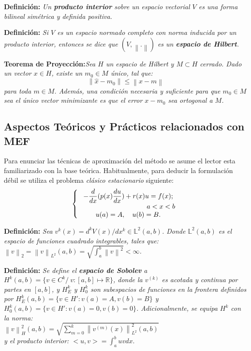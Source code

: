 \documentclass[12pt]{article}
\begin{document}
{\bf Definición: } {\em Un \textbf{producto interior} sobre un espacio vectorial $V$ es una forma bilineal simétrica y definida positiva.}

{\bf Definición: }{\em Si $V$ es un espacio normado completo con norma inducida por un producto interior, entonces se dice que $(V,\left\|.\right\|)$ es un \textbf{espacio de Hilbert}.}

{\bf Teorema de Proyección:}{\em Sea $H$ un espacio de Hilbert y $M\subset H$ cerrado. Dado un vector $\textit{x} \in H$, existe un $m_0 \in M$ único, tal que:
\[\left\| \hat{x}- m_0\right \| \leq \left\| x-m\right\|\]
para toda $m \in M$. Además, una condición necesaria y suficiente para que $m_0 \in M$ sea el único vector minimizante es que el error $\textit{x}-m_0$ sea ortogonal a $M$. }


\subsection{Aspectos Teóricos y Prácticos relacionados con MEF}
Para enunciar las técnicas de aproximación del método se asume el lector esta familiarizado con la base teórica. Habitualmente, para deducir la formulación débil se utiliza el problema \textit{clásico estacionario} siguiente:
\begin{equation} 
\left\{
\begin{array}{c}
-\dfrac{d}{dx}(p(x)\dfrac{du}{dx}) + r(x)u = f(x);\\
\hspace{3.4cm} a< x < b\\
u(a) = A,  \quad u(b) = B.
\label{Ecu:09}
\end{array} \right.  
\end{equation}

{\bf Definición:} {\em Sea $v^k(x) = d^k{V(x)}/d{x^k} \in \mathbb{L}^2(a,b) $.	Donde $\mathbb{L}^2(a,b)$ es el espacio de funciones cuadrado integrables, tales que:\\
$\left\|v\right\|_2 = \left\|v\right\|_{L^2}{(a,b)} = \sqrt{\int_{a}^{b}\left\|v\right\|^2} < \infty$.}

{\bf Definición:} {\em Se define el \textbf{espacio de Sobolev} a $H^k(a,b)= \{ v \in C^k/ \ v:[a,b] \longmapsto \mathbb{R}\}$, donde la $v^{(k)}$ es acotada y continua por partes en $[a,b]$, y $H^k_E$ y $H^k_0$ son subespacios de funciones en la frontera definidos por $H^k_E(a,b) = \{ v \in H': v(a)=A, v(b)=B \}$ y  $H^k_0(a,b) = \{ v \in H': v(a)=0, v(b)=0\}$. Adicionalmente, se equipa $H^k$ con la norma:\\ $\left\|v\right\|_H^2(a,b) = \sqrt{\sum_{m=0}^{k}\left\|v^{(m)}(x)\right\|^2_{L^2}{(a,b)}}$\\
 y el producto interior: $<u,v>=\int_a^b uv dx.$}
\end{document}
